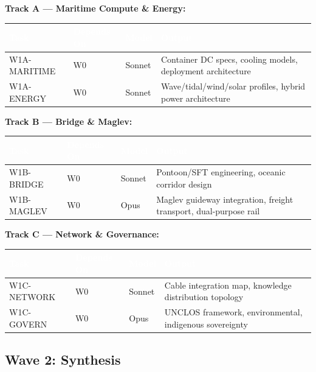 \documentclass[11pt,letterpaper]{article}
\newcommand{\tableheader}[1]{\textbf{\sffamily\textcolor{white}{#1}}}
\begin{document}
\textbf{Track A --- Maritime Compute \& Energy:}

\begin{center}
\begin{tabularx}{\textwidth}{L{3cm}L{2cm}C{1.5cm}X}
\toprule
{}
\tableheader{Task} & \tableheader{Depends On} & \tableheader{Model} & \tableheader{Output} \\
\midrule
W1A-MARITIME & W0 & Sonnet & Container DC specs, cooling models, deployment architecture \\
W1A-ENERGY & W0 & Sonnet & Wave/tidal/wind/solar profiles, hybrid power architecture \\
\bottomrule
\end{tabularx}
\end{center}

\textbf{Track B --- Bridge \& Maglev:}

\begin{center}
\begin{tabularx}{\textwidth}{L{3cm}L{2cm}C{1.5cm}X}
\toprule
{}
\tableheader{Task} & \tableheader{Depends On} & \tableheader{Model} & \tableheader{Output} \\
\midrule
W1B-BRIDGE & W0 & Sonnet & Pontoon/SFT engineering, oceanic corridor design \\
W1B-MAGLEV & W0 & Opus & Maglev guideway integration, freight transport, dual-purpose rail \\
\bottomrule
\end{tabularx}
\end{center}

\textbf{Track C --- Network \& Governance:}

\begin{center}
\begin{tabularx}{\textwidth}{L{3cm}L{2cm}C{1.5cm}X}
\toprule
{}
\tableheader{Task} & \tableheader{Depends On} & \tableheader{Model} & \tableheader{Output} \\
\midrule
W1C-NETWORK & W0 & Sonnet & Cable integration map, knowledge distribution topology \\
W1C-GOVERN & W0 & Opus & UNCLOS framework, environmental, indigenous sovereignty \\
\bottomrule
\end{tabularx}
\end{center}

\subsection{Wave 2: Synthesis}
\end{document}
